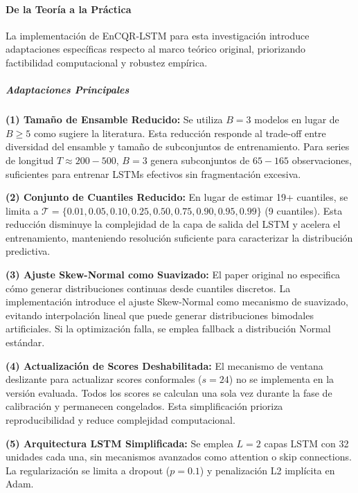 \paragraph{De la Teoría a la Práctica}

La implementación de EnCQR-LSTM para esta investigación introduce adaptaciones específicas respecto al marco teórico original, priorizando factibilidad computacional y robustez empírica.

\subparagraph{Adaptaciones Principales}

\textbf{(1) Tamaño de Ensamble Reducido:} Se utiliza $B=3$ modelos en lugar de $B \geq 5$ como sugiere la literatura. Esta reducción responde al trade-off entre diversidad del ensamble y tamaño de subconjuntos de entrenamiento. Para series de longitud $T \approx 200-500$, $B=3$ genera subconjuntos de $65-165$ observaciones, suficientes para entrenar LSTMs efectivos sin fragmentación excesiva.

\textbf{(2) Conjunto de Cuantiles Reducido:} En lugar de estimar 19+ cuantiles, se limita a $\mathcal{T} = \{0.01, 0.05, 0.10, 0.25, 0.50, 0.75, 0.90, 0.95, 0.99\}$ (9 cuantiles). Esta reducción disminuye la complejidad de la capa de salida del LSTM y acelera el entrenamiento, manteniendo resolución suficiente para caracterizar la distribución predictiva.

\textbf{(3) Ajuste Skew-Normal como Suavizado:} El paper original no especifica cómo generar distribuciones continuas desde cuantiles discretos. La implementación introduce el ajuste Skew-Normal como mecanismo de suavizado, evitando interpolación lineal que puede generar distribuciones bimodales artificiales. Si la optimización falla, se emplea fallback a distribución Normal estándar.

\textbf{(4) Actualización de Scores Deshabilitada:} El mecanismo de ventana deslizante para actualizar scores conformales ($s=24$) no se implementa en la versión evaluada. Todos los scores se calculan una sola vez durante la fase de calibración y permanecen congelados. Esta simplificación prioriza reproducibilidad y reduce complejidad computacional.

\textbf{(5) Arquitectura LSTM Simplificada:} Se emplea $L=2$ capas LSTM con 32 unidades cada una, sin mecanismos avanzados como attention o skip connections. La regularización se limita a dropout ($p=0.1$) y penalización L2 implícita en Adam.

